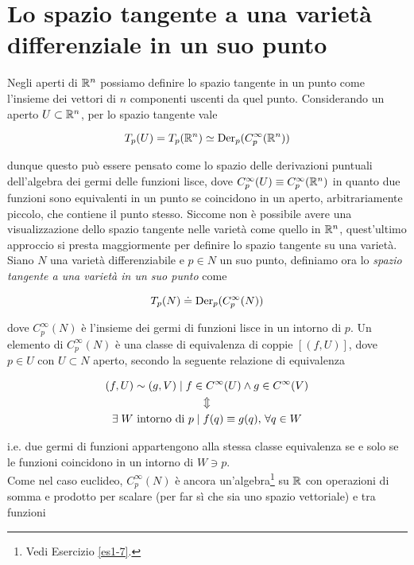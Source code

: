 \section{Lo spazio tangente a una varietà differenziale in un suo punto}

Negli aperti di $ \mathbb{R}^{n} $ possiamo definire lo spazio tangente in un punto come l'insieme dei vettori di $ n $ componenti uscenti da quel punto. Considerando un aperto $ U \subset \mathbb{R}^{n} $, per lo spazio tangente vale

\begin{equation}
	T_{p}(U) = T_{p}(\mathbb{R}^{n}) \simeq \operatorname{Der}_{p}(C_{p}^{\infty}(\mathbb{R}^{n}))
\end{equation}

dunque questo può essere pensato come lo spazio delle derivazioni puntuali dell'algebra dei germi delle funzioni lisce, dove $ C_{p}^{\infty}(U) \equiv C_{p}^{\infty}(\mathbb{R}^{n}) $ in quanto due funzioni sono equivalenti in un punto se coincidono in un aperto, arbitrariamente piccolo, che contiene il punto stesso. Siccome non è possibile avere una visualizzazione dello spazio tangente nelle varietà come quello in $ \mathbb{R}^{n} $, quest'ultimo approccio si presta maggiormente per definire lo spazio tangente su una varietà.\\
Siano $ N $ una varietà differenziabile e $ p \in N $ un suo punto, definiamo ora lo \textit{spazio tangente a una varietà in un suo punto} come

\begin{equation}
	T_{p}(N) \doteq \operatorname{Der}_{p}(C_{p}^{\infty}(N))
\end{equation}

dove $ C_{p}^{\infty}(N) $ è l'insieme dei germi di funzioni lisce in un intorno di $ p $. Un elemento di $ C_{p}^{\infty}(N) $ è una classe di equivalenza di coppie $ [(f,U)] $, dove $ p \in U $ con $ U \subset N $ aperto, secondo la seguente relazione di equivalenza

\begin{gather}
	(f,U) \sim (g,V) \mid f \in C^{\infty}(U) \wedge g \in C^{\infty}(V) \nonumber\\
	\Updownarrow\\
	\exists \; W \text{ intorno di } p \mid f(q) \equiv g(q) , \, \forall q \in W \nonumber
\end{gather}

i.e. due germi di funzioni appartengono alla stessa classe equivalenza se e solo se le funzioni coincidono in un intorno di $ W \ni p $.\\
Come nel caso euclideo, $ C_{p}^{\infty}(N) $ è ancora un'algebra\footnote{%
	Vedi Esercizio \ref{es1-7}.%
} su $ \mathbb{R} $ con operazioni di somma e prodotto per scalare (per far sì che sia uno spazio vettoriale) e tra funzioni

